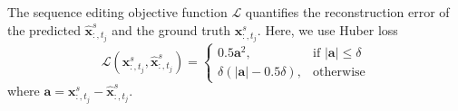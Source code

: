 %
The sequence editing objective function $\mathcal{L}$ quantifies the reconstruction error of the predicted $\hat{\mathbf{x}}^s_{:,t_j}$ and the ground truth $\mathbf{x}^s_{:,t_j}$. Here, we use Huber loss
\begin{equation}
    \mathcal{L}(\mathbf{x}^s_{:,t_j}, \hat{\mathbf{x}}^s_{:,t_j}) = \begin{cases}
        0.5 \mathbf{a}^2, & \text{if $\vert \mathbf{a} \vert \leq \delta$} \\
        \delta(\vert \mathbf{a} \vert - 0.5\delta), & \text{otherwise}
    \end{cases}
\end{equation}
where $\mathbf{a} = \mathbf{x}^s_{:,t_j} - \hat{\mathbf{x}}^s_{:,t_j}$.
